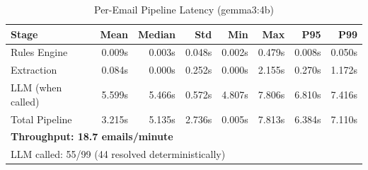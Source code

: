 \begin{table}[h]
\centering
\caption{Per-Email Pipeline Latency (gemma3:4b)}
\label{tab:e7_latency}
\begin{tabular}{l r r r r r r r}
\hline
Stage & Mean & Median & Std & Min & Max & P95 & P99 \\
\hline
Rules Engine & 0.009s & 0.003s & 0.048s & 0.002s & 0.479s & 0.008s & 0.050s \\
Extraction & 0.084s & 0.000s & 0.252s & 0.000s & 2.155s & 0.270s & 1.172s \\
LLM (when called) & 5.599s & 5.466s & 0.572s & 4.807s & 7.806s & 6.810s & 7.416s \\
Total Pipeline & 3.215s & 5.135s & 2.736s & 0.005s & 7.813s & 6.384s & 7.110s \\
\hline
\multicolumn{8}{l}{\textbf{Throughput: 18.7 emails/minute}} \\
\multicolumn{8}{l}{LLM called: 55/99 (44 resolved deterministically)} \\
\hline
\end{tabular}
\end{table}